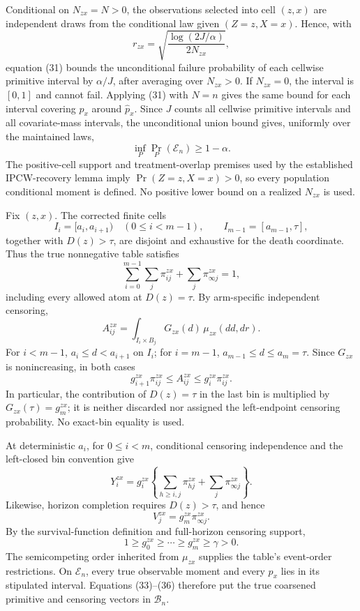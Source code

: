 Conditional on \(N_{zx}=N>0\), the observations selected into cell \((z,x)\) are independent draws from the conditional law given \((Z=z,X=x)\).  Hence, with
\[
r_{zx}=\sqrt{\frac{\log(2J/\alpha)}{2N_{zx}}},
\]
equation (31) bounds the unconditional failure probability of each cellwise primitive interval by \(\alpha/J\), after averaging over \(N_{zx}>0\).  If \(N_{zx}=0\), the interval is \([0,1]\) and cannot fail.  Applying (31) with \(N=n\) gives the same bound for each interval covering \(p_x\) around \(\widehat p_x\).  Since \(J\) counts all cellwise primitive intervals and all covariate-mass intervals, the unconditional union bound gives, uniformly over the maintained laws,
\[
\inf_P\Pr_P(\mathscr E_n)\geq1-\alpha.                               \tag{32}
\]
The positive-cell support and treatment-overlap premises used by the established IPCW-recovery lemma imply \(\Pr(Z=z,X=x)>0\), so every population conditional moment is defined.  No positive lower bound on a realized \(N_{zx}\) is used.

Fix \((z,x)\).  The corrected finite cells
\[
I_i=[a_i,a_{i+1})\quad(0\leq i<m-1),
\qquad I_{m-1}=[a_{m-1},\tau],
\]
together with \(D(z)>\tau\), are disjoint and exhaustive for the death coordinate.  Thus the true nonnegative table satisfies
\[
\sum_{i=0}^{m-1}\sum_j\pi^{zx}_{ij}+\sum_j\pi^{zx}_{\infty j}=1,       \tag{33}
\]
including every allowed atom at \(D(z)=\tau\).  By arm-specific independent censoring,
\[
A^{zx}_{ij}=\int_{I_i\times B_j}G_{zx}(d)\,\mu_{zx}(d d,d r).
\]
For \(i<m-1\), \(a_i\leq d<a_{i+1}\) on \(I_i\); for \(i=m-1\), \(a_{m-1}\leq d\leq a_m=\tau\).  Since \(G_{zx}\) is nonincreasing, in both cases
\[
g^{zx}_{i+1}\pi^{zx}_{ij}
\leq A^{zx}_{ij}
\leq g^{zx}_i\pi^{zx}_{ij}.                                         \tag{34}
\]
In particular, the contribution of \(D(z)=\tau\) in the last bin is multiplied by \(G_{zx}(\tau)=g^{zx}_m\); it is neither discarded nor assigned the left-endpoint censoring probability.  No exact-bin equality is used.

At deterministic \(a_i\), for \(0\leq i<m\), conditional censoring independence and the left-closed bin convention give
\[
Y^{zx}_i=g^{zx}_i\left\{\sum_{h\geq i,j}\pi^{zx}_{hj}
 +\sum_j\pi^{zx}_{\infty j}\right\}.
\]
Likewise, horizon completion requires \(D(z)>\tau\), and hence
\[
V^{zx}_j=g^{zx}_m\pi^{zx}_{\infty j}.                               \tag{35}
\]
By the survival-function definition and full-horizon censoring support,
\[
1\geq g^{zx}_0\geq\cdots\geq g^{zx}_m\geq\gamma>0.                  \tag{36}
\]
The semicompeting order inherited from \(\mu_{zx}\) supplies the table's event-order restrictions.  On \(\mathscr E_n\), every true observable moment and every \(p_x\) lies in its stipulated interval.  Equations (33)--(36) therefore put the true coarsened primitive and censoring vectors in \(\mathcal B_n\).

